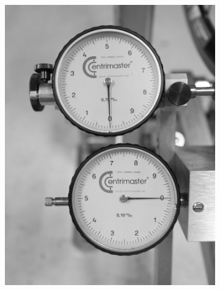\documentclass[mathserif]{beamer}
\begin{document}
\begin{frame}
\begin{figure}
\begin{subfigure}[b]{0.2\textwidth}
            \includegraphics[width=\textwidth]{zero}
            \caption{}
        \end{subfigure}
        \quad
        \begin{subfigure}[b]{0.2\textwidth}

\end{subfigure}
\end{figure}
\end{frame}
\end{document}
